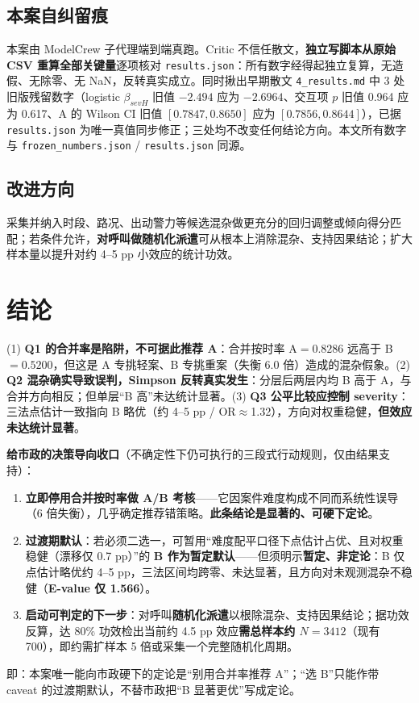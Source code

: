 \documentclass[12pt,a4paper]{ctexart}
\begin{document}
\subsection{本案自纠留痕}
本案由 ModelCrew 子代理端到端真跑。Critic 不信任散文，\textbf{独立写脚本从原始 CSV 重算全部关键量}逐项核对 \texttt{results.json}：所有数字经得起独立复算，无造假、无除零、无 NaN，反转真实成立。同时揪出早期散文 \texttt{4\_results.md} 中 3 处旧版残留数字（logistic $\beta_{sevH}$ 旧值 $-2.494$ 应为 $-2.6964$、交互项 $p$ 旧值 0.964 应为 0.617、A 的 Wilson CI 旧值 $[0.7847,0.8650]$ 应为 $[0.7856,0.8644]$），已据 \texttt{results.json} 为唯一真值同步修正；三处均不改变任何结论方向。本文所有数字与 \texttt{frozen\_numbers.json} / \texttt{results.json} 同源。

\subsection{改进方向}
采集并纳入时段、路况、出动警力等候选混杂做更充分的回归调整或倾向得分匹配；若条件允许，\textbf{对呼叫做随机化派遣}可从根本上消除混杂、支持因果结论；扩大样本量以提升对约 4--5 pp 小效应的统计功效。

\section{结论}
(1) \textbf{Q1 的合并率是陷阱，不可据此推荐 A}：合并按时率 A$=0.8286$ 远高于 B$=0.5200$，但这是 A 专挑轻案、B 专挑重案（失衡 6.0 倍）造成的混杂假象。(2) \textbf{Q2 混杂确实导致误判，Simpson 反转真实发生}：分层后两层内均 B 高于 A，与合并方向相反；但单层``B 高''未达统计显著。(3) \textbf{Q3 公平比较应控制 severity}：三法点估计一致指向 B 略优（约 4--5 pp / OR$\approx$1.32），方向对权重稳健，\textbf{但效应未达统计显著}。

\textbf{给市政的决策导向收口}（不确定性下仍可执行的三段式行动规则，仅由结果支持）：

\begin{enumerate}
\item \textbf{立即停用合并按时率做 A/B 考核}——它因案件难度构成不同而系统性误导（6 倍失衡），几乎确定推荐错策略。\textbf{此条结论是显著的、可硬下定论}。
\item \textbf{过渡期默认}：若必须二选一，可暂用``难度配平口径下点估计占优、且对权重稳健（漂移仅 0.7 pp）''的 \textbf{B 作为暂定默认}——但须明示\textbf{暂定、非定论}：B 仅点估计略优约 4--5 pp，三法区间均跨零、未达显著，且方向对未观测混杂不稳健（\textbf{E-value 仅 1.566}）。
\item \textbf{启动可判定的下一步}：对呼叫\textbf{随机化派遣}以根除混杂、支持因果结论；据功效反算，达 80\% 功效检出当前约 4.5 pp 效应\textbf{需总样本约 $N=3412$}（现有 700），即约需扩样本 5 倍或采集一个完整随机化周期。
\end{enumerate}
即：本案唯一能向市政硬下的定论是``别用合并率推荐 A''；``选 B''只能作带 caveat 的过渡期默认，不替市政把``B 显著更优''写成定论。
\end{document}
